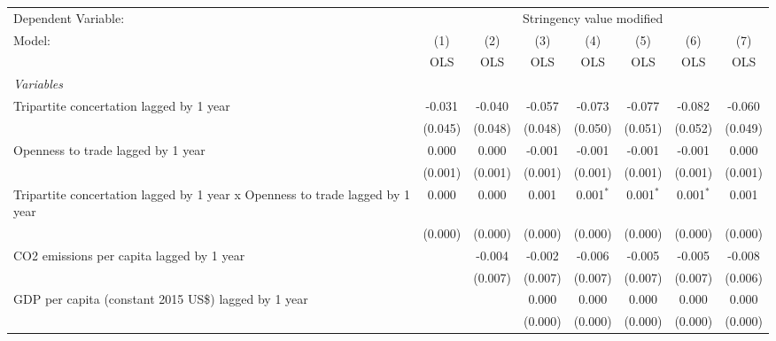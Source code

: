
\begingroup
\centering
\begin{tabular}{lccccccc}
   \toprule
   Dependent Variable: & \multicolumn{7}{c}{Stringency value modified}\\
   Model:                                                                        & (1)     & (2)     & (3)     & (4)         & (5)         & (6)         & (7)\\  
                                                                                 &  OLS    & OLS     & OLS     & OLS         & OLS         & OLS         & OLS\\  
   \midrule
   \emph{Variables}\\
   Tripartite concertation lagged by 1 year                                      & -0.031  & -0.040  & -0.057  & -0.073      & -0.077      & -0.082      & -0.060\\   
                                                                                 & (0.045) & (0.048) & (0.048) & (0.050)     & (0.051)     & (0.052)     & (0.049)\\   
   Openness to trade lagged by 1 year                                            & 0.000   & 0.000   & -0.001  & -0.001      & -0.001      & -0.001      & 0.000\\   
                                                                                 & (0.001) & (0.001) & (0.001) & (0.001)     & (0.001)     & (0.001)     & (0.001)\\   
   Tripartite concertation lagged by 1 year x Openness to trade lagged by 1 year & 0.000   & 0.000   & 0.001   & 0.001$^{*}$ & 0.001$^{*}$ & 0.001$^{*}$ & 0.001\\   
                                                                                 & (0.000) & (0.000) & (0.000) & (0.000)     & (0.000)     & (0.000)     & (0.000)\\   
   CO2 emissions per capita lagged by 1 year                                     &         & -0.004  & -0.002  & -0.006      & -0.005      & -0.005      & -0.008\\   
                                                                                 &         & (0.007) & (0.007) & (0.007)     & (0.007)     & (0.007)     & (0.006)\\   
   GDP per capita (constant 2015 US\$) lagged by 1 year                          &         &         & 0.000   & 0.000       & 0.000       & 0.000       & 0.000\\   
                                                                                 &         &         & (0.000) & (0.000)     & (0.000)     & (0.000)     & (0.000)\\   

\end{tabular}
